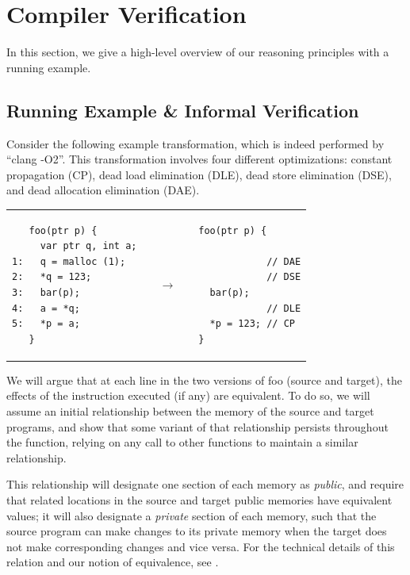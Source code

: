 \section{Compiler Verification}
\label{sec:intptrcast:compiler-verification}

In this section, we give a high-level overview of our reasoning principles
with a running example.

\subsection{Running Example \& Informal Verification}
\label{reasoning:running}

Consider the following example transformation, which is indeed
performed by ``clang -O2''.  This transformation involves four different optimizations: constant propagation (CP), dead load elimination
(DLE), dead store elimination (DSE), and dead allocation elimination
(DAE).
\begin{center}
\begin{tabular}{@{}l@{}l@{}l@{}}
\begin{minipage}{0.37\textwidth}
\begin{verbatim}
   foo(ptr p) {
     var ptr q, int a;
1:   q = malloc (1);
2:   *q = 123;
3:   bar(p);
4:   a = *q;
5:   *p = a;
   }
\end{verbatim}
\end{minipage}
&
$\quad\rightarrow\quad$
&
\begin{minipage}{0.37\textwidth}
\begin{verbatim}
foo(ptr p) {

            // DAE
            // DSE
  bar(p);
            // DLE
  *p = 123; // CP
}
\end{verbatim}
\end{minipage}
\end{tabular}
\end{center}

We will argue that at each line in the two versions of foo (source and target), the effects of the instruction executed (if any) are equivalent. To do so, we will assume an initial relationship between the memory of the source and target programs, and show that some variant of that relationship persists throughout the function, relying on any call to other functions to maintain a similar relationship. 

This relationship will designate one section of each memory as \emph{public}, and require that related locations in the source and target public memories have equivalent values; it will also designate a \emph{private} section of each memory, such that the source program can make changes to its private memory when the target does not make corresponding changes and vice versa. For the technical details of this relation and our notion of equivalence, see .

